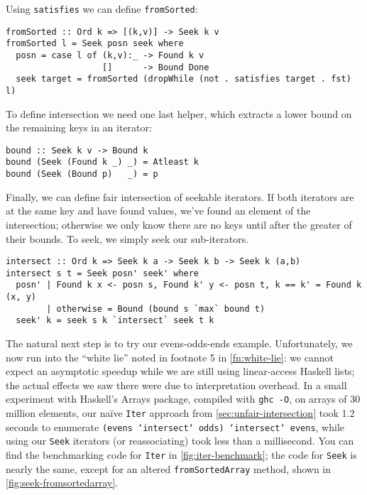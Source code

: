 \documentclass[acmsmall,screen,dvipsnames,svgnames]{acmart}
\newcommand\hask[1]{\texttt{#1}}
\newcommand\ttt\texttt
\newcommand\todo[1]{{\color{Orange}#1}}
\renewcommand\todo[1]{{\color{IndianRed}#1}}
\newcommand\oldtodo[1]{\todo{#1}}
\renewcommand\todo[1]{\ignorespaces}
\begin{document}
\noindent
Using \ttt{satisfies} we can define \ttt{fromSorted}:

\begin{verbatim}
fromSorted :: Ord k => [(k,v)] -> Seek k v
fromSorted l = Seek posn seek where
  posn = case l of (k,v):_ -> Found k v
                   []      -> Bound Done
  seek target = fromSorted (dropWhile (not . satisfies target . fst) l)
\end{verbatim}

\noindent
To define intersection we need one last helper, which extracts a lower bound on the remaining keys in an iterator:

\begin{verbatim}
bound :: Seek k v -> Bound k
bound (Seek (Found k _) _) = Atleast k
bound (Seek (Bound p)   _) = p
\end{verbatim}

\noindent
Finally, we can define fair intersection of seekable iterators.
If both iterators are at the same key and have found values, we've found an element of the intersection; otherwise we only know there are no keys until after the greater of their bounds.
To seek, we simply seek our sub-iterators.
\oldtodo{Point out that this \emph{bounds} the work done by a single call to seek.}

\begin{verbatim}
intersect :: Ord k => Seek k a -> Seek k b -> Seek k (a,b)
intersect s t = Seek posn' seek' where
  posn' | Found k x <- posn s, Found k' y <- posn t, k == k' = Found k (x, y)
        | otherwise = Bound (bound s `max` bound t)
  seek' k = seek s k `intersect` seek t k
\end{verbatim}

\noindent
The natural next step is to try our evens-odds-ends example.
Unfortunately, we now run into the ``white lie'' noted in footnote 5 in \cref{fn:white-lie}:
we cannot expect an asymptotic speedup while we are still using linear-access Haskell lists; the actual effects we saw there were due to interpretation overhead.
In a small experiment with Haskell's Arrays package, compiled with \ttt{ghc -O}, on arrays of 30 million elements, our na\"ive \hask{Iter} approach from \cref{sec:unfair-intersection} took 1.2 seconds to enumerate \ttt{(evens `intersect` odds) `intersect` evens}, while using our \hask{Seek} iterators (or reassociating) took less than a millisecond.
You can find the benchmarking code for \hask{Iter} in \cref{fig:iter-benchmark}; the code for \hask{Seek} is nearly the same, except for an altered \ttt{fromSortedArray} method, shown in \cref{fig:seek-fromsortedarray}.
\end{document}
